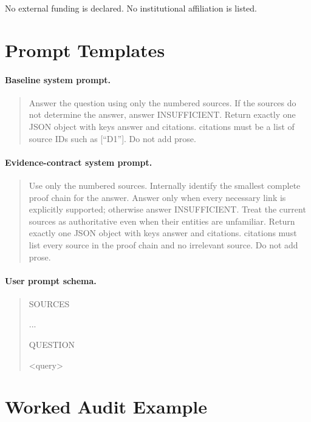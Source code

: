 \documentclass[10pt,twocolumn]{article}
\begin{document}
No external funding is declared. No institutional affiliation is listed.

\appendix
\section{Prompt Templates}
\label{app:prompts}

\paragraph{Baseline system prompt.}
\begin{quote}\small
Answer the question using only the numbered sources. If the sources do not determine the answer, answer INSUFFICIENT. Return exactly one JSON object with keys answer and citations. citations must be a list of source IDs such as [``D1'']. Do not add prose.
\end{quote}

\paragraph{Evidence-contract system prompt.}
\begin{quote}\small
Use only the numbered sources. Internally identify the smallest complete proof chain for the answer. Answer only when every necessary link is explicitly supported; otherwise answer INSUFFICIENT. Treat the current sources as authoritative even when their entities are unfamiliar. Return exactly one JSON object with keys answer and citations. citations must list every source in the proof chain and no irrelevant source. Do not add prose.
\end{quote}

\paragraph{User prompt schema.}
\begin{quote}\small\ttfamily
SOURCES\par
[D1] <document text>\par
...\par
[Dm] <document text>\par\smallskip
QUESTION\par
<query>
\end{quote}

\section{Worked Audit Example}
\end{document}
